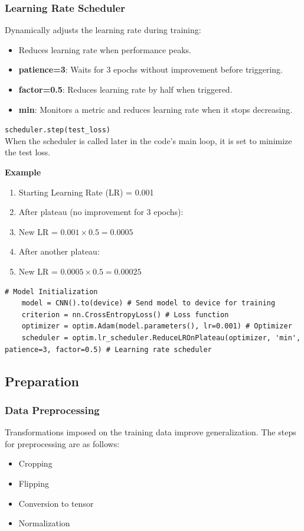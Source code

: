 \subsubsection{Learning Rate Scheduler}
Dynamically adjusts the learning rate during training:
\begin{itemize}
    \item Reduces learning rate when performance peaks.
    \item \textbf{patience=3}: Waits for 3 epochs without improvement before triggering.
    \item \textbf{factor=0.5}: Reduces learning rate by half when triggered.
    \item \textbf{min}: Monitors a metric and reduces learning rate when it stops decreasing.
\end{itemize}

\texttt{scheduler.step(test\_loss)} \\ 
When the scheduler is called later in the code's main loop, it is set to minimize the test loss.

\textbf{Example}
\begin{enumerate}
    \item Starting Learning Rate (LR) = 0.001
    \item After plateau (no improvement for 3 epochs):
    \item New LR = $0.001 \times 0.5 = 0.0005$
    \item After another plateau:
    \item New LR = $0.0005 \times 0.5 = 0.00025$
\end{enumerate}

\begin{lstlisting}[caption={Model Initialization}, label={lst:model_init}]
    # Model Initialization
    model = CNN().to(device) # Send model to device for training
    criterion = nn.CrossEntropyLoss() # Loss function
    optimizer = optim.Adam(model.parameters(), lr=0.001) # Optimizer
    scheduler = optim.lr_scheduler.ReduceLROnPlateau(optimizer, 'min', patience=3, factor=0.5) # Learning rate scheduler
\end{lstlisting}

\subsection{Preparation}

\subsubsection{Data Preprocessing}
Transformations imposed on the training data improve generalization. The steps for preprocessing 
are as follows:
\begin{itemize}
    \item Cropping
    \item Flipping
    \item Conversion to tensor
    \item Normalization
\end{itemize}

